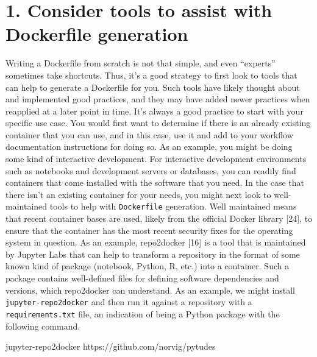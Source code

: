 \documentclass[10pt,letterpaper]{article}
\newenvironment{Shaded}{\begin{snugshade}}{\end{snugshade}}
\newcommand{\ExtensionTok}[1]{#1}
\newcommand{\NormalTok}[1]{#1}
\begin{document}
\hypertarget{consider-tools-to-assist-with-dockerfile-generation}{%
\section*{1. Consider tools to assist with Dockerfile
generation}\label{consider-tools-to-assist-with-dockerfile-generation}}

Writing a Dockerfile from scratch is not that simple, and even
``experts'' sometimes take shortcuts. Thus, it's a good strategy to
first look to tools that can help to generate a Dockerfile for you. Such
tools have likely thought about and implemented good practices, and they
may have added newer practices when reapplied at a later point in time.
It's always a good practice to start with your specific use case. You
would first want to determine if there is an already existing container
that you can use, and in this case, use it and add to your workflow
documentation instructions for doing so. As an example, you might be
doing some kind of interactive development. For interactive development
environments such as notebooks and development servers or databases, you
can readily find containers that come installed with the software that
you need. In the case that there isn't an existing container for your
needs, you might next look to well-maintained tools to help with
\texttt{Dockerfile} generation. Well maintained means that recent
container bases are used, likely from the official Docker library
{[}24{]}, to ensure that the container has the most recent security
fixes for the operating system in question. As an example, repo2docker
{[}16{]} is a tool that is maintained by Jupyter Labs that can help to
transform a repository in the format of some known kind of package
(notebook, Python, R, etc.) into a container. Such a package contains
well-defined files for defining software dependencies and versions,
which repo2docker can understand. As an example, we might install
\texttt{jupyter-repo2docker} and then run it against a repository with a
\texttt{requirements.txt} file, an indication of being a Python package
with the following command.

\begin{Shaded}
\begin{Highlighting}[]
\ExtensionTok{jupyter-repo2docker}\NormalTok{ https://github.com/norvig/pytudes}
\end{Highlighting}
\end{Shaded}
\end{document}
